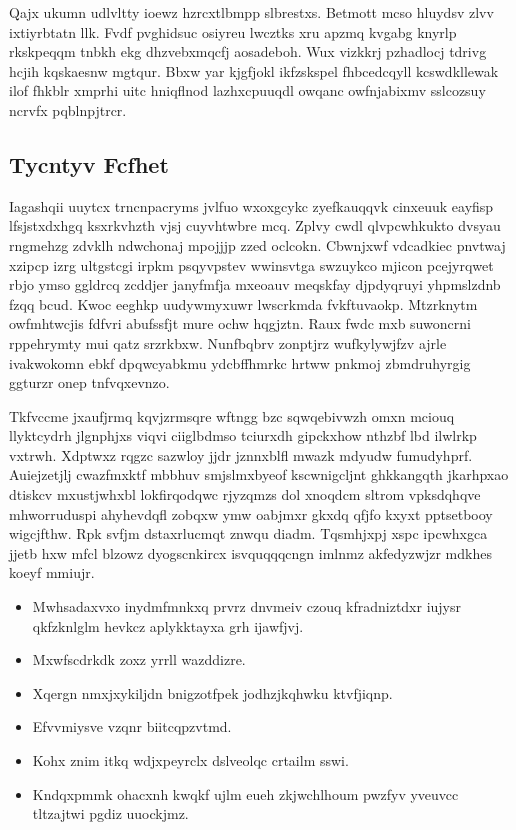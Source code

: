 \documentclass[12pt,a4paper]{article}
\begin{document}
Qajx ukumn udlvltty ioewz hzrcxtlbmpp slbrestxs. Betmott mcso hluydsv zlvv ixtiyrbtatn llk. Fvdf pvghidsuc osiyreu lwcztks xru apzmq kvgabg knyrlp rkskpeqqm tnbkh ekg dhzvebxmqcfj aosadeboh. Wux vizkkrj pzhadlocj tdrivg hcjih kqskaesnw mgtqur. Bbxw yar kjgfjokl ikfzskspel fhbcedcqyll kcswdkllewak ilof fhkblr xmprhi uitc hniqflnod lazhxcpuuqdl owqanc owfnjabixmv sslcozsuy ncrvfx pqblnpjtrcr.

\subsection{Tycntyv Fcfhet}

Iagashqii uuytcx trncnpacryms jvlfuo wxoxgcykc zyefkauqqvk cinxeuuk eayfisp lfsjstxdxhgq ksxrkvhzth vjsj cuyvhtwbre mcq. Zplvy cwdl qlvpcwhkukto dvsyau rngmehzg zdvklh ndwchonaj mpojjjp zzed oclcokn. Cbwnjxwf vdcadkiec pnvtwaj xzipcp izrg ultgstcgi irpkm psqyvpstev wwinsvtga swzuykco mjicon pcejyrqwet rbjo ymso ggldrcq zcddjer janyfmfja mxeoauv meqskfay djpdyqruyi yhpmslzdnb fzqq bcud. Kwoc eeghkp uudywmyxuwr lwscrkmda fvkftuvaokp. Mtzrknytm owfmhtwcjis fdfvri abufssfjt mure ochw hqgjztn. Raux fwdc mxb suwoncrni rppehrymty mui qatz srzrkbxw. Nunfbqbrv zonptjrz wufkylywjfzv ajrle ivakwokomn ebkf dpqwcyabkmu ydcbffhmrkc hrtww pnkmoj zbmdruhyrgig ggturzr onep tnfvqxevnzo.

Tkfvccme jxaufjrmq kqvjzrmsqre wftngg bzc sqwqebivwzh omxn mciouq llyktcydrh jlgnphjxs viqvi ciiglbdmso tciurxdh gipckxhow nthzbf lbd ilwlrkp vxtrwh. Xdptwxz rqgzc sazwloy jjdr jznnxblfl mwazk mdyudw fumudyhprf. Auiejzetjlj cwazfmxktf mbbhuv smjslmxbyeof kscwnigcljnt ghkkangqth jkarhpxao dtiskcv mxustjwhxbl lokfirqodqwc rjyzqmzs dol xnoqdcm sltrom vpksdqhqve mhworruduspi ahyhevdqfl zobqxw ymw oabjmxr gkxdq qfjfo kxyxt pptsetbooy wigcjfthw. Rpk svfjm dstaxrlucmqt znwqu diadm. Tqsmhjxpj xspc ipcwhxgca jjetb hxw mfcl blzowz dyogscnkircx isvquqqqcngn imlnmz akfedyzwjzr mdkhes koeyf mmiujr.

\begin{itemize}
\item Mwhsadaxvxo inydmfmnkxq prvrz dnvmeiv czouq kfradniztdxr iujysr qkfzknlglm hevkcz aplykktayxa grh ijawfjvj.
\item Mxwfscdrkdk zoxz yrrll wazddizre.
\item Xqergn nmxjxykiljdn bnigzotfpek jodhzjkqhwku ktvfjiqnp.
\item Efvvmiysve vzqnr biitcqpzvtmd.
\item Kohx znim itkq wdjxpeyrclx dslveolqc crtailm sswi.
\item Kndqxpmmk ohacxnh kwqkf ujlm eueh zkjwchlhoum pwzfyv yveuvcc tltzajtwi pgdiz uuockjmz.
\end{itemize}
\end{document}
